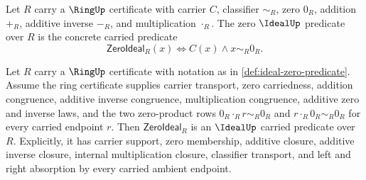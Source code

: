 \begin{definition}
\label{def:ideal-zero-predicate}
Let $R$ carry a $\RingUp$ certificate with carrier $C$, classifier $\sim_R$, zero $0_R$, addition $+_R$, additive inverse $-_R$, and multiplication $\cdot_R$. The zero $\IdealUp$ predicate over $R$ is the concrete carried predicate
$$
\mathsf{ZeroIdeal}_R(x)\Longleftrightarrow C(x)\land x\sim_R0_R.
$$
\end{definition}

\begin{theorem}
\label{thm:ideal-zero-predicate-ideal-closure}
Let $R$ carry a $\RingUp$ certificate with notation as in \autoref{def:ideal-zero-predicate}. Assume the ring certificate supplies carrier transport, zero carriedness, addition congruence, additive inverse congruence, multiplication congruence, additive zero and inverse laws, and the two zero-product rows $0_R\cdot_R r\sim_R0_R$ and $r\cdot_R0_R\sim_R0_R$ for every carried endpoint $r$. Then $\mathsf{ZeroIdeal}_R$ is an $\IdealUp$ carried predicate over $R$. Explicitly, it has carrier support, zero membership, additive closure, additive inverse closure, internal multiplication closure, classifier transport, and left and right absorption by every carried ambient endpoint.
\end{theorem}
